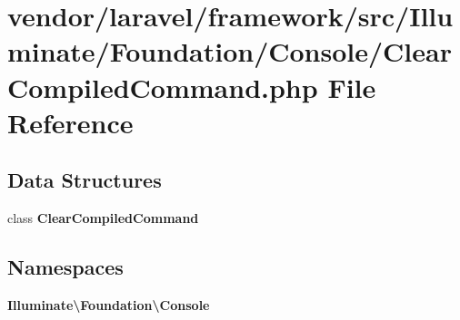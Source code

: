 \section{vendor/laravel/framework/src/\+Illuminate/\+Foundation/\+Console/\+Clear\+Compiled\+Command.php File Reference}
\label{_clear_compiled_command_8php}
\subsection*{Data Structures}
\begin{DoxyCompactItemize}
\item 
class {\bf Clear\+Compiled\+Command}
\end{DoxyCompactItemize}
\subsection*{Namespaces}
\begin{DoxyCompactItemize}
\item 
 {\bf Illuminate\textbackslash{}\+Foundation\textbackslash{}\+Console}
\end{DoxyCompactItemize}
